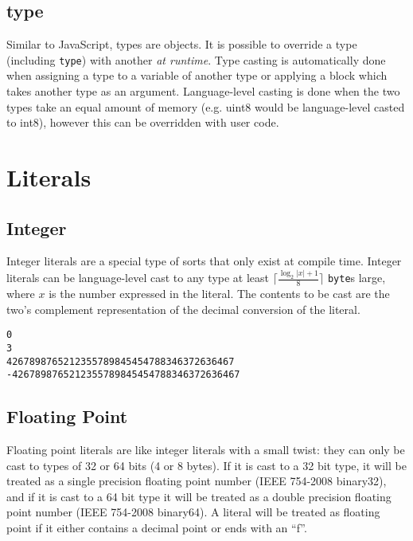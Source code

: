 \documentclass[letterpaper,titlepage]{scrreprt}
\begin{document}
\subsection{type}
\label{subsec:type}

Similar to JavaScript, types are objects. It is possible to override a type (including \lstinline{type}) with another \emph{at runtime}. Type casting is automatically done when assigning a type to a variable of another type or applying a block which takes another type as an argument. Language-level casting is done when the two types take an equal amount of memory (e.g. uint8 would be language-level casted to int8), however this can be overridden with user code.

\section{Literals}
\label{sec:Literals}

\subsection{Integer}
\label{subsec:Integer}

Integer literals are a special type of sorts that only exist at compile time. Integer literals can be language-level cast to any type at least $\lceil\frac{\log_2 |x| + 1}{8}\rceil$ \lstinline{byte}s large, where $x$ is the number expressed in the literal. The contents to be cast are the two's complement representation of the decimal conversion of the literal.

\begin{lstlisting}[caption={Integer literal examples},label=lst:integer]
0
3
4267898765212355789845454788346372636467
-4267898765212355789845454788346372636467
\end{lstlisting}

\subsection{Floating Point}
\label{subsec:FloatingPoint}

Floating point literals are like integer literals with a small twist: they can only be cast to types of 32 or 64 bits (4 or 8 bytes). If it is cast to a 32 bit type, it will be treated as a single precision floating point number (IEEE 754-2008 binary32), and if it is cast to a 64 bit type it will be treated as a double precision floating point number (IEEE 754-2008 binary64). A literal will be treated as floating point if it either contains a decimal point or ends with an ``f''.
\end{document}
